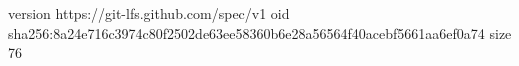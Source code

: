 version https://git-lfs.github.com/spec/v1
oid sha256:8a24e716c3974c80f2502de63ee58360b6e28a56564f40acebf5661aa6ef0a74
size 76

